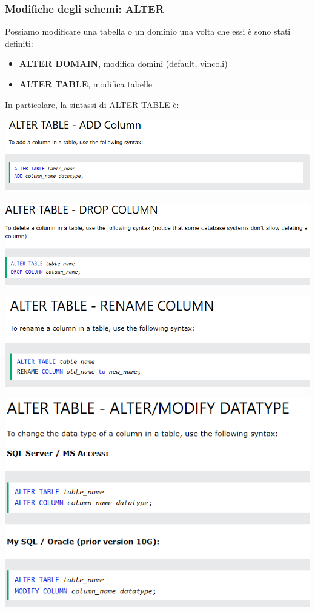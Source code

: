 \documentclass[12pt]{article}
\begin{document}
\subsubsection{Modifiche degli schemi: ALTER}
Possiamo modificare una tabella o un dominio una volta che essi è sono stati definiti:
\begin{itemize}
    \item \textbf{ALTER DOMAIN}, modifica domini (default, vincoli)
    \item \textbf{ALTER TABLE}, modifica tabelle
\end{itemize}
In particolare, la sintassi di ALTER TABLE è:
\begin{center}
    \includegraphics[width = 1.20\textwidth]{Images/186.PNG}
\end{center}
\begin{center}
    \includegraphics[width = 1.20\textwidth]{Images/187.PNG}
\end{center}
\begin{center}
    \includegraphics[width = 1.20\textwidth]{Images/188.PNG}
\end{center}
\begin{center}
    \includegraphics[width = 1.20\textwidth]{Images/189.PNG}
\end{center}
\newpage
\end{document}
